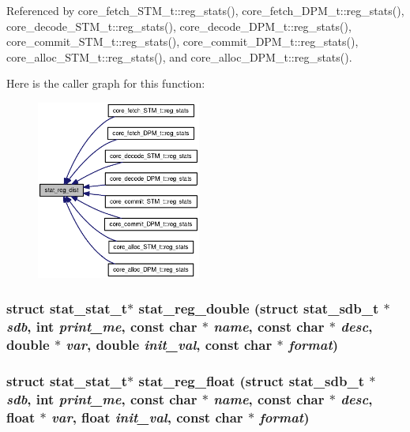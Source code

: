 Referenced by core\_\-fetch\_\-STM\_\-t::reg\_\-stats(), core\_\-fetch\_\-DPM\_\-t::reg\_\-stats(), core\_\-decode\_\-STM\_\-t::reg\_\-stats(), core\_\-decode\_\-DPM\_\-t::reg\_\-stats(), core\_\-commit\_\-STM\_\-t::reg\_\-stats(), core\_\-commit\_\-DPM\_\-t::reg\_\-stats(), core\_\-alloc\_\-STM\_\-t::reg\_\-stats(), and core\_\-alloc\_\-DPM\_\-t::reg\_\-stats().

Here is the caller graph for this function:\nopagebreak
\begin{figure}[H]
\begin{center}
\leavevmode
\includegraphics[width=153pt]{zesto_2stats_8h_b68118a778041ff66b7dec8bf1030ef4_icgraph}
\end{center}
\end{figure}
\subsubsection[{stat\_\-reg\_\-double}]{\setlength{\rightskip}{0pt plus 5cm}struct {\bf stat\_\-stat\_\-t}$\ast$ stat\_\-reg\_\-double (struct {\bf stat\_\-sdb\_\-t} $\ast$ {\em sdb}, \/  int {\em print\_\-me}, \/  const char $\ast$ {\em name}, \/  const char $\ast$ {\em desc}, \/  double $\ast$ {\em var}, \/  double {\em init\_\-val}, \/  const char $\ast$ {\em format})\hspace{0.3cm}{\tt  [read]}}\label{zesto_2stats_8h_be1b2059ba7cd215a0dddb2da620dbaf}


\subsubsection[{stat\_\-reg\_\-float}]{\setlength{\rightskip}{0pt plus 5cm}struct {\bf stat\_\-stat\_\-t}$\ast$ stat\_\-reg\_\-float (struct {\bf stat\_\-sdb\_\-t} $\ast$ {\em sdb}, \/  int {\em print\_\-me}, \/  const char $\ast$ {\em name}, \/  const char $\ast$ {\em desc}, \/  float $\ast$ {\em var}, \/  float {\em init\_\-val}, \/  const char $\ast$ {\em format})\hspace{0.3cm}{\tt  [read]}}\label{zesto_2stats_8h_378cfba0435cd73f9c4ecb78c2d64681}


